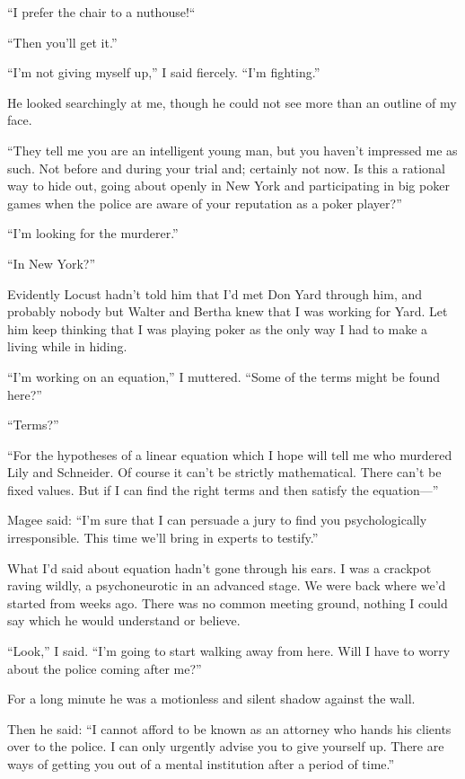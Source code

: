 \documentclass{novel}
\begin{document}
“I prefer the chair to a nuthouse!“

“Then you’ll get it.”

“I’m not giving myself up,” I said fiercely. “I’m fighting.”

He looked searchingly at me, though he could not see more than an outline of my face.

“They tell me you are an intelligent young man, but you haven’t impressed me as such. Not before and during your trial and; certainly not now. Is this a rational way to hide out, going about openly in New York and participating in big poker games when the police are aware of your reputation as a poker player?”

“I’m looking for the murderer.”

“In New York?”

\scenestars

Evidently Locust hadn’t told him that I’d met Don Yard through him, and probably nobody but Walter and Bertha knew that I was working for Yard. Let him keep thinking that I was playing poker as the only way I had to make a living while in hiding.

“I’m working on an equation,” I muttered. “Some of the terms might be found here?”

“Terms?”

“For the hypotheses of a linear equation which I hope will tell me who murdered Lily and Schneider. Of course it can’t be strictly mathematical. There can’t be fixed values. But if I can find the right terms and then satisfy the equation—”

Magee said: “I’m sure that I can persuade a jury to find you psychologically irresponsible. This time we’ll bring in experts to testify.”

What I’d said about equation hadn’t gone through his ears. I was a crackpot raving wildly, a psychoneurotic in an advanced stage. We were back where we’d started from weeks ago. There was no common meeting ground, nothing I could say which he would understand or believe.

“Look,” I said. “I’m going to start walking away from here. Will I have to worry about the police coming after me?”

For a long minute he was a motionless and silent shadow against the wall. 

Then he said: “I cannot afford to be known as an attorney who hands his clients over to the police. I can only urgently advise you to give yourself up. There are ways of getting you out of a mental institution after a period of time.”
\end{document}
